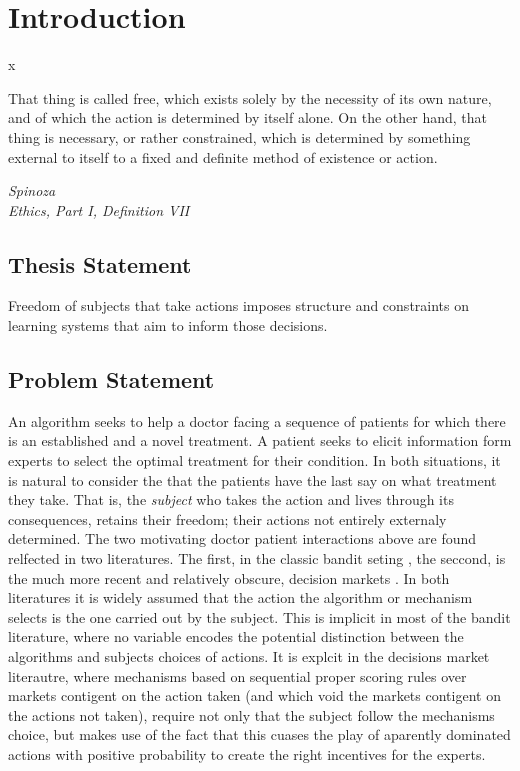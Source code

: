 \chapter{Introduction}x
\label{cha:intro}



\epigraph{
That thing is called free, which exists solely by the necessity of its own nature, and of which the action is determined by itself alone. On the other hand, that thing is necessary, or rather constrained, which is determined by something external to itself to a fixed and definite method of existence or action.}{\textit{Spinoza \\Ethics, Part I, Definition VII}}


\section{Thesis Statement}
\label{sec:thesisstatement}

Freedom of subjects that take actions imposes structure and constraints on learning systems that aim to inform those decisions. 

\section{Problem Statement}
\label{sec:problemstatement}


An algorithm seeks to help a doctor facing a sequence of patients for which there is an established and a novel treatment. A patient seeks to elicit information form experts to select the optimal treatment for their condition. In both situations, it is natural to consider the  that the patients have the last say on what treatment they take. That is, the \emph{subject} who takes the action and lives through its consequences, retains their freedom; their actions not entirely externaly determined.
The two motivating doctor patient interactions above are found relfected in two literatures. The first, in the classic bandit seting \cite{thompson:33,gittins1979bandit,bubeck:12}, the seccond, is the much more recent and relatively obscure, decision markets \cite{berg2003prediction,hanson2002decision,othman2010decision,boutilier2012eliciting,chen2014eliciting}. In both literatures it is widely assumed that the action the algorithm or mechanism selects is the one carried out by the subject. This is implicit in most of the bandit literature, where no variable encodes the potential distinction between the algorithms and subjects choices of actions. It is explcit in the decisions market literautre, where mechanisms based on sequential proper scoring rules over markets contigent on the action taken (and which void the markets contigent on the actions not taken), require not only that the subject follow the mechanisms choice, but makes use of the fact that this cuases the play of aparently dominated actions with positive probability to create the right incentives for the experts. 


